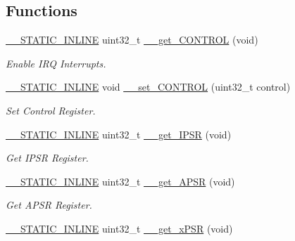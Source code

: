 \subsection*{Functions}
\begin{DoxyCompactItemize}
\item 
\hyperlink{cmsis__iccarm_8h_aba87361bfad2ae52cfe2f40c1a1dbf9c}{\+\_\+\+\_\+\+S\+T\+A\+T\+I\+C\+\_\+\+I\+N\+L\+I\+NE} uint32\+\_\+t \hyperlink{group___c_m_s_i_s___core___reg_acc_functions_ga7dd5c942bee32f055b90153feb950f59}{\+\_\+\+\_\+get\+\_\+\+C\+O\+N\+T\+R\+OL} (void)
\begin{DoxyCompactList}\small\item\em Enable I\+RQ Interrupts. \end{DoxyCompactList}\item 
\hyperlink{cmsis__iccarm_8h_aba87361bfad2ae52cfe2f40c1a1dbf9c}{\+\_\+\+\_\+\+S\+T\+A\+T\+I\+C\+\_\+\+I\+N\+L\+I\+NE} void \hyperlink{group___c_m_s_i_s___core___reg_acc_functions_ga0102d0939d9b26c5c792be6bf5fd550f}{\+\_\+\+\_\+set\+\_\+\+C\+O\+N\+T\+R\+OL} (uint32\+\_\+t control)
\begin{DoxyCompactList}\small\item\em Set Control Register. \end{DoxyCompactList}\item 
\hyperlink{cmsis__iccarm_8h_aba87361bfad2ae52cfe2f40c1a1dbf9c}{\+\_\+\+\_\+\+S\+T\+A\+T\+I\+C\+\_\+\+I\+N\+L\+I\+NE} uint32\+\_\+t \hyperlink{group___c_m_s_i_s___core___reg_acc_functions_gaf15a71855b9d731d11de92704c82bd18}{\+\_\+\+\_\+get\+\_\+\+I\+P\+SR} (void)
\begin{DoxyCompactList}\small\item\em Get I\+P\+SR Register. \end{DoxyCompactList}\item 
\hyperlink{cmsis__iccarm_8h_aba87361bfad2ae52cfe2f40c1a1dbf9c}{\+\_\+\+\_\+\+S\+T\+A\+T\+I\+C\+\_\+\+I\+N\+L\+I\+NE} uint32\+\_\+t \hyperlink{group___c_m_s_i_s___core___reg_acc_functions_gadff4f1e599946e8ae96fba17b5245f04}{\+\_\+\+\_\+get\+\_\+\+A\+P\+SR} (void)
\begin{DoxyCompactList}\small\item\em Get A\+P\+SR Register. \end{DoxyCompactList}\item 
\hyperlink{cmsis__iccarm_8h_aba87361bfad2ae52cfe2f40c1a1dbf9c}{\+\_\+\+\_\+\+S\+T\+A\+T\+I\+C\+\_\+\+I\+N\+L\+I\+NE} uint32\+\_\+t \hyperlink{group___c_m_s_i_s___core___reg_acc_functions_ga52ca795dc9429ee0ac64ddd12c034834}{\+\_\+\+\_\+get\+\_\+x\+P\+SR} (void)

\end{DoxyCompactItemize}
